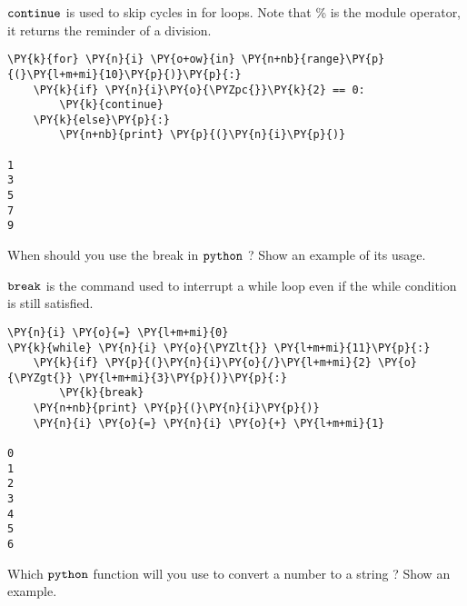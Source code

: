\begin{Answer}
\(\tt{continue}\) is used to skip cycles in for loops. Note that \% is
the module operator, it returns the reminder of a division.

\begin{codebox}[size=fbox, boxrule=1pt, colback=cellbackground, colframe=cellborder]
\begin{Verbatim}[commandchars=\\\{\}]
\PY{k}{for} \PY{n}{i} \PY{o+ow}{in} \PY{n+nb}{range}\PY{p}{(}\PY{l+m+mi}{10}\PY{p}{)}\PY{p}{:}
    \PY{k}{if} \PY{n}{i}\PY{o}{\PYZpc{}}\PY{k}{2} == 0:
        \PY{k}{continue}
    \PY{k}{else}\PY{p}{:}
        \PY{n+nb}{print} \PY{p}{(}\PY{n}{i}\PY{p}{)}

1
3
5
7
9
\end{Verbatim}
\end{codebox}
\end{Answer}

\begin{Exercise}
When should you use the break in \(\tt{python}\) ? Show an example of its usage.
\end{Exercise}

\begin{Answer}
\(\tt{break}\) is the command used to interrupt a while loop even if the
while condition is still satisfied.

\begin{codebox}[size=fbox, boxrule=1pt, colback=cellbackground, colframe=cellborder]
\begin{Verbatim}[commandchars=\\\{\}]
\PY{n}{i} \PY{o}{=} \PY{l+m+mi}{0}
\PY{k}{while} \PY{n}{i} \PY{o}{\PYZlt{}} \PY{l+m+mi}{11}\PY{p}{:}
    \PY{k}{if} \PY{p}{(}\PY{n}{i}\PY{o}{/}\PY{l+m+mi}{2} \PY{o}{\PYZgt{}} \PY{l+m+mi}{3}\PY{p}{)}\PY{p}{:}
        \PY{k}{break}
    \PY{n+nb}{print} \PY{p}{(}\PY{n}{i}\PY{p}{)}
    \PY{n}{i} \PY{o}{=} \PY{n}{i} \PY{o}{+} \PY{l+m+mi}{1}

0
1
2
3
4
5
6
\end{Verbatim}
\end{codebox}  
\end{Answer}

\begin{Exercise}
Which \(\tt{python}\) function will you use to convert a number to a string ? Show an example.
\end{Exercise}


